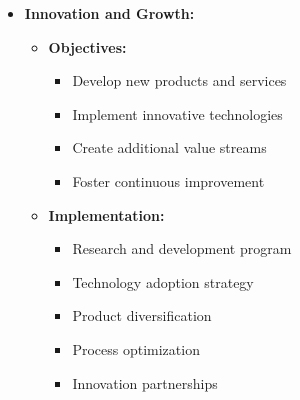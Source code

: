 \begin{itemize}
    \item \textbf{Innovation and Growth:}
    \begin{itemize}
        \item \textbf{Objectives:}
        \begin{itemize}
            \item Develop new products and services
            \item Implement innovative technologies
            \item Create additional value streams
            \item Foster continuous improvement
        \end{itemize}
        \item \textbf{Implementation:}
        \begin{itemize}
            \item Research and development program
            \item Technology adoption strategy
            \item Product diversification
            \item Process optimization
            \item Innovation partnerships
        \end{itemize}
    \end{itemize}
\end{itemize}

